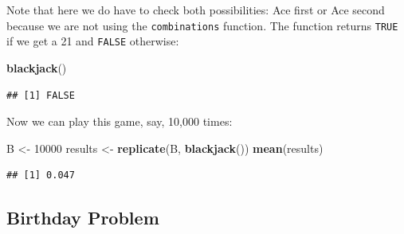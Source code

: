 \documentclass[
  openany]{book}
\newenvironment{Shaded}{\begin{snugshade}}{\end{snugshade}}
\newcommand{\ControlFlowTok}[1]{\textcolor[rgb]{0.13,0.29,0.53}{\textbf{#1}}}
\newcommand{\DecValTok}[1]{\textcolor[rgb]{0.00,0.00,0.81}{#1}}
\newcommand{\KeywordTok}[1]{\textcolor[rgb]{0.13,0.29,0.53}{\textbf{#1}}}
\newcommand{\NormalTok}[1]{#1}
\newcommand{\OperatorTok}[1]{\textcolor[rgb]{0.81,0.36,0.00}{\textbf{#1}}}
\newcommand{\StringTok}[1]{\textcolor[rgb]{0.31,0.60,0.02}{#1}}
\begin{document}
\begin{Shaded}
\end{Shaded}

Note that here we do have to check both possibilities: Ace first or Ace second because we are not using the \texttt{combinations} function. The function returns \texttt{TRUE} if we get a 21 and \texttt{FALSE} otherwise:

\begin{Shaded}
\begin{Highlighting}[]
\KeywordTok{blackjack}\NormalTok{()}
\end{Highlighting}
\end{Shaded}

\begin{verbatim}
## [1] FALSE
\end{verbatim}

Now we can play this game, say, 10,000 times:

\begin{Shaded}
\begin{Highlighting}[]
\NormalTok{B <-}\StringTok{ }\DecValTok{10000}
\NormalTok{results <-}\StringTok{ }\KeywordTok{replicate}\NormalTok{(B, }\KeywordTok{blackjack}\NormalTok{())}
\KeywordTok{mean}\NormalTok{(results)}
\end{Highlighting}
\end{Shaded}

\begin{verbatim}
## [1] 0.047
\end{verbatim}

\hypertarget{birthday-problem}{%
\subsection{Birthday Problem}\label{birthday-problem}}
\end{document}
